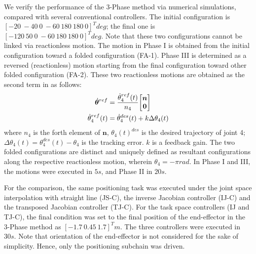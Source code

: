 %
We verify the performance of the 3-Phase method via numerical simulations,
compared with several conventional controllers.
The initial configuration is $[-20~-40~0~-60~180~180~0]^{T}\unit{deg}$;
the final one is $[-120~50~0~-60~180~180~0]^{T}\unit{deg}$.
Note that these two configurations cannot be linked via reactionless motion.
The motion in Phase I is obtained from the initial configuration toward
a folded configuration (FA-1).
Phase III is determined as a reversed (reactionless) motion starting from the final configuration toward
other folded configuration (FA-2).
These two reactionless motions are obtained as the second term in  as follows:
%
\begin{align}
  {\dot{\bm{\theta}}}^{ref} &= \frac{\dot{\theta}_{4}^{ref}(t)}{n_{4}}{\begin{bmatrix} \bm{n} \\ \bm{0} \end{bmatrix}}\\
  \dot{\theta}_{4}^{ref}(t) &= \dot{\theta}_{4}^{des}(t) + k\Delta\theta_{4}(t)
  \label{eq:PS_MOTION}
\end{align}
%
where $n_{4}$ is the forth element of $\bm{n}$,
$\theta_{4}(t)^{des}$ is the desired trajectory of joint 4;
$\Delta\theta_{4}(t) = \theta_{4}^{des}(t) - \theta_{4}$ is the tracking error.
$k$ is a feedback gain.
The two folded configurations are distinct and uniquely defined as resultant configurations
along the respective reactionless motion, wherein $\theta_{4} = -\pi\unit{rad}$.
In Phase I and III,
the motions were executed in $5\unit{s}$,
and Phase II in $20\unit{s}$.

For the comparison,
the same positioning task was executed under the joint space interpolation with straight line (JS-C),
the inverse Jacobian controller (IJ-C) and the transposed Jacobian controller (TJ-C).
For the task space controllers (IJ and TJ-C),
the final condition was set to the final position of the end-effector in the 3-Phase method as
$[-1.7~0.45~1.7]^{T}\unit{m}$.
The three controllers were executed in $30\unit{s}$.
Note that orientation of the end-effector is not considered for the sake of simplicity.
Hence, only the positioning subchain was driven.

